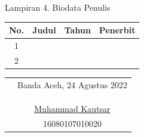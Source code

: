 \begin{appendices}{Lampiran 4. Biodata Penulis}
\begin{enumerate}
\begin{table}[h!]
                \begin{tabular}{|c|l|l|l|} %
                \hline %
                No. & Judul & Tahun & Penerbit\\
                \hline %
                1   & & & \\
                \hline
                2   & & & \\
                \hline %
                \end{tabular}
            \end{table}
    \end{enumerate}

    \begin{tabular}{p{7.5cm}c}
        &Banda Aceh, 24 Agustus 2022\\
        &\\
        &\\
        &\\
        &\underline{Muhammad Kautsar}\\
        &16080107010020
    \end{tabular}

\end{appendices}



